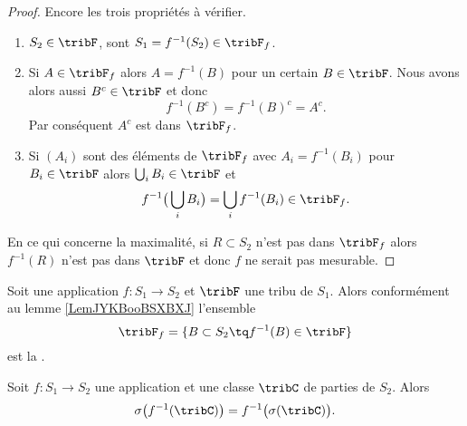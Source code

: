 \begin{proof}
    Encore les trois propriétés à vérifier.
    \begin{enumerate}
        \item
            \( S_2\in\tribF\), sont \( S_1=f^{-1}(S_2)\in \tribF_f\).
        \item
            Si \( A\in \tribF_f\) alors \( A=f^{-1}(B)\) pour un certain \( B\in \tribF\). Nous avons alors aussi \( B^c\in \tribF\) et donc 
            \begin{equation}
                f^{-1}(B^c)=f^{-1}(B)^c=A^c.
            \end{equation}
            Par conséquent \( A^c\) est dans \( \tribF_f\).
        \item
            Si \( (A_i)\) sont des éléments de \( \tribF_f\) avec \( A_i=f^{-1}(B_i)\) pour \( B_i\in \tribF\) alors \( \bigcup_iB_i\in\tribF\) et
            \begin{equation}
                f^{-1}\big( \bigcup_iB_i \big)=\bigcup_if^{-1}(B_i)\in\tribF_f.
            \end{equation}
    \end{enumerate}
    En ce qui concerne la maximalité, si \( R\subset S_2\) n'est pas dans \( \tribF_f\) alors \( f^{-1}(R)\) n'est pas dans \( \tribF\) et donc \( f\) ne serait pas mesurable.
\end{proof}

\begin{definition} \label{DefNOJWooLGKhmJ}
    Soit une application \( f\colon S_1\to S_2\) et \( \tribF\) une tribu de \( S_1\). Alors conformément au lemme \ref{LemJYKBooBSXBXJ} l'ensemble
            \begin{equation}
                \tribF_f=\{  B\subset S_2\tq f^{-1}(B)\in \tribF  \}
            \end{equation}
            est la .
\end{definition}

\begin{lemma}       \label{LemOQTBooWGYuDU}
    Soit \( f\colon S_1\to S_2\) une application et une classe \( \tribC\) de parties de \( S_2\). Alors
    \begin{equation}
        \sigma\big( f^{-1}(\tribC) \big)=f^{-1}\big( \sigma(\tribC) \big).
    \end{equation}
\end{lemma}

